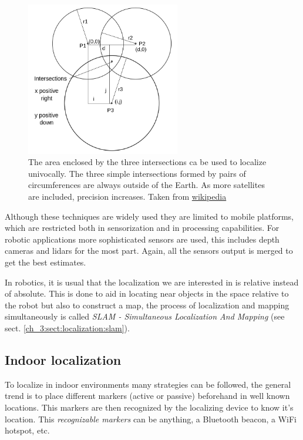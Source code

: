       \begin{figure}
        \centering
        \includegraphics[width=0.6\textwidth]{./Figures/trilateration.png}
        \caption{The area enclosed by the three intersections ca be used to localize univocally. The three simple intersections formed by pairs of circumferences are always outside of the Earth. As more satellites are included, precision increases. Taken from \href{https://en.wikipedia.org/wiki/Trilateration}{wikipedia}}
        \label{ch_3:fig:trilateration}
      \end{figure}

      Although these techniques are widely used they are limited to mobile platforms, which are restricted both in sensorization and in processing capabilities. For robotic applications more sophisticated sensors are used, this includes depth cameras and lidars for the most part. Again, all the sensors output is merged to get the best estimates.

      In robotics, it is usual that the localization we are interested in is relative instead of absolute. This is done to aid in locating near objects in the space relative to the robot but also to construct a map, the process of localization and mapping simultaneously is called \textit{SLAM - Simultaneous Localization And Mapping} (see sect. \ref{ch_3:sect:localization:slam}).

    \subsection{Indoor localization} \label{ch_3:sect:localization:indoor}

      To localize in indoor environments many strategies can be followed, the general trend is to place different markers (active or passive) beforehand in well known locations. This markers are then recognized by the localizing device to know it's location. This \textit{recognizable markers} can be anything, a Bluetooth beacon, a WiFi hotspot, etc.

